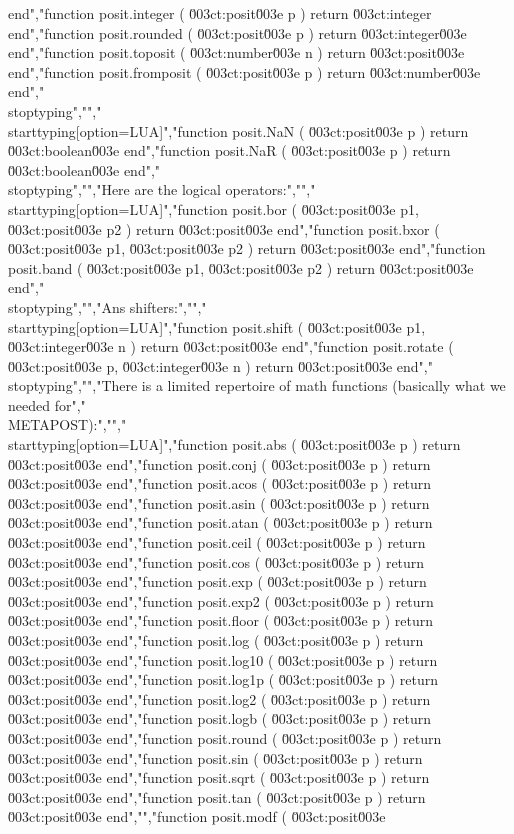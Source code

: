 end","function posit.integer   ( \u003ct:posit\u003e  p ) return \u003ct:integer  end","function posit.rounded   ( \u003ct:posit\u003e  p ) return \u003ct:integer\u003e end","function posit.toposit   ( \u003ct:number\u003e n ) return \u003ct:posit\u003e   end","function posit.fromposit ( \u003ct:posit\u003e  p ) return \u003ct:number\u003e  end","\\stoptyping","","\\starttyping[option=LUA]","function posit.NaN ( \u003ct:posit\u003e p ) return \u003ct:boolean\u003e end","function posit.NaR ( \u003ct:posit\u003e p ) return \u003ct:boolean\u003e end","\\stoptyping","","Here are the logical operators:","","\\starttyping[option=LUA]","function posit.bor  ( \u003ct:posit\u003e p1, \u003ct:posit\u003e p2 ) return \u003ct:posit\u003e end","function posit.bxor ( \u003ct:posit\u003e p1, \u003ct:posit\u003e p2 ) return \u003ct:posit\u003e end","function posit.band ( \u003ct:posit\u003e p1, \u003ct:posit\u003e p2 ) return \u003ct:posit\u003e end","\\stoptyping","","Ans shifters:","","\\starttyping[option=LUA]","function posit.shift  ( \u003ct:posit\u003e p1, \u003ct:integer\u003e n ) return \u003ct:posit\u003e end","function posit.rotate ( \u003ct:posit\u003e p,  \u003ct:integer\u003e n ) return \u003ct:posit\u003e end","\\stoptyping","","There is a limited repertoire of math functions (basically what we needed for","\\METAPOST):","","\\starttyping[option=LUA]","function posit.abs   ( \u003ct:posit\u003e p ) return \u003ct:posit\u003e end","function posit.conj  ( \u003ct:posit\u003e p ) return \u003ct:posit\u003e end","function posit.acos  ( \u003ct:posit\u003e p ) return \u003ct:posit\u003e end","function posit.asin  ( \u003ct:posit\u003e p ) return \u003ct:posit\u003e end","function posit.atan  ( \u003ct:posit\u003e p ) return \u003ct:posit\u003e end","function posit.ceil  ( \u003ct:posit\u003e p ) return \u003ct:posit\u003e end","function posit.cos   ( \u003ct:posit\u003e p ) return \u003ct:posit\u003e end","function posit.exp   ( \u003ct:posit\u003e p ) return \u003ct:posit\u003e end","function posit.exp2  ( \u003ct:posit\u003e p ) return \u003ct:posit\u003e end","function posit.floor ( \u003ct:posit\u003e p ) return \u003ct:posit\u003e end","function posit.log   ( \u003ct:posit\u003e p ) return \u003ct:posit\u003e end","function posit.log10 ( \u003ct:posit\u003e p ) return \u003ct:posit\u003e end","function posit.log1p ( \u003ct:posit\u003e p ) return \u003ct:posit\u003e end","function posit.log2  ( \u003ct:posit\u003e p ) return \u003ct:posit\u003e end","function posit.logb  ( \u003ct:posit\u003e p ) return \u003ct:posit\u003e end","function posit.round ( \u003ct:posit\u003e p ) return \u003ct:posit\u003e end","function posit.sin   ( \u003ct:posit\u003e p ) return \u003ct:posit\u003e end","function posit.sqrt  ( \u003ct:posit\u003e p ) return \u003ct:posit\u003e end","function posit.tan   ( \u003ct:posit\u003e p ) return \u003ct:posit\u003e end","","function posit.modf ( \u003ct:posit\u003e 
